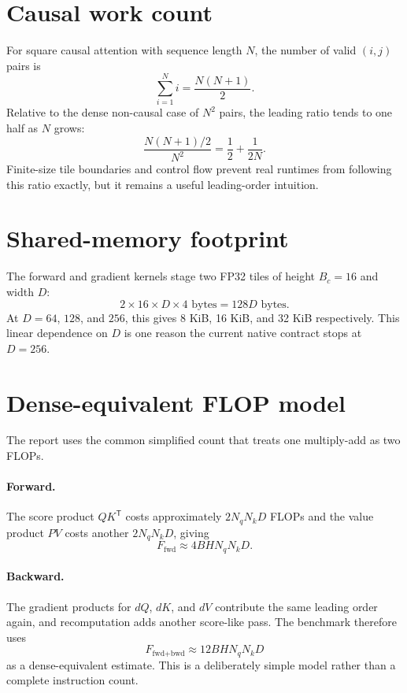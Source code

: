 \section{Causal work count}

For square causal attention with sequence length $N$, the number of valid $(i,j)$ pairs is
\begin{equation}
  \sum_{i=1}^{N} i = \frac{N(N+1)}{2}.
\end{equation}
Relative to the dense non-causal case of $N^2$ pairs, the leading ratio tends to one half as $N$ grows:
\begin{equation}
  \frac{N(N+1)/2}{N^2} = \frac{1}{2} + \frac{1}{2N}.
\end{equation}
Finite-size tile boundaries and control flow prevent real runtimes from following this ratio exactly, but it remains a useful leading-order intuition.

\section{Shared-memory footprint}

The forward and gradient kernels stage two FP32 tiles of height $B_c=16$ and width $D$:
\begin{equation}
  2 \times 16 \times D \times 4 \text{ bytes} = 128D \text{ bytes}.
\end{equation}
At $D=64$, $128$, and $256$, this gives 8 KiB, 16 KiB, and 32 KiB respectively. This linear dependence on $D$ is one reason the current native contract stops at $D=256$.

\section{Dense-equivalent FLOP model}

The report uses the common simplified count that treats one multiply-add as two FLOPs.

\paragraph{Forward.}
The score product $QK^{\mathsf T}$ costs approximately $2N_qN_kD$ FLOPs and the value product $PV$ costs another $2N_qN_kD$, giving
\begin{equation}
  F_{\text{fwd}} \approx 4BHN_qN_kD.
\end{equation}

\paragraph{Backward.}
The gradient products for $dQ$, $dK$, and $dV$ contribute the same leading order again, and recomputation adds another score-like pass. The benchmark therefore uses
\begin{equation}
  F_{\text{fwd+bwd}} \approx 12BHN_qN_kD
\end{equation}
as a dense-equivalent estimate. This is a deliberately simple model rather than a complete instruction count.
